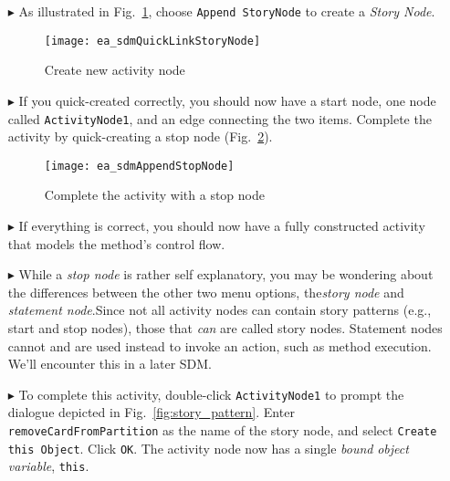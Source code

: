 \begin{itemize}
\item[$\blacktriangleright$] As illustrated in Fig.~\ref{fig:sdm_new_activity_node}, choose \texttt{Append StoryNode} to create a \emph{Story Node}.

\begin{figure}[htp]
\begin{center}
  \texttt{[image: ea\_sdmQuickLinkStoryNode]}
  \caption{Create new activity node}  
  \label{fig:sdm_new_activity_node}
\end{center}
\end{figure}

\item[$\blacktriangleright$] If you quick-created correctly, you should now have a start node, one node called \texttt{ActivityNode1}, and an edge
connecting the two items. Complete the activity by quick-creating a stop node (Fig.~\ref{fig:sdm_stop_node}).

\begin{figure}[htp]
\begin{center}
  \texttt{[image: ea\_sdmAppendStopNode]}
  \caption{Complete the activity with a stop node}  
  \label{fig:sdm_stop_node}
\end{center}
\end{figure}

\vspace{0.5cm}

\item[$\blacktriangleright$] If everything is correct, you should now have a fully constructed activity that models the method's control flow.

\item[$\blacktriangleright$] While a \emph{stop node} is rather self explanatory, you may be wondering about the differences between the other two menu options,
the\emph{story node} and \emph{statement node}.Since not all activity nodes can contain story patterns (e.g., start
and stop nodes), those that \emph{can} are called story nodes. Statement nodes cannot and are used instead to invoke an action, such as method execution. We'll
encounter this in a later SDM.

\item[$\blacktriangleright$] To complete this activity, double-click \texttt{ActivityNode1} to prompt the dialogue depicted in
Fig.~\ref{fig:story_pattern}. Enter \texttt{removeCardFromPartition} as the name of the story node, and select \texttt{Create this Object}.  Click
\texttt{OK}. The activity node now has a single \emph{bound} \emph{object variable}, \texttt{this}.


\end{itemize}
